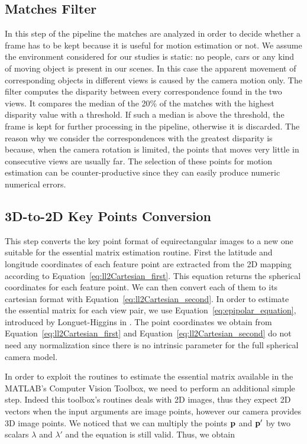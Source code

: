 \subsection{Matches Filter}
In this step of the pipeline the matches are analyzed in order to decide 
whether a frame has to be kept because it is useful for motion estimation or
not.
We assume the environment considered for our studies is static: no people, 
cars or any kind of moving object is present in our scenes. In this case the 
apparent movement of corresponding objects in different views is caused by 
the camera motion only.
The filter computes the disparity between every correspondence found in the 
two views. It compares the median of the 20\% of the matches with the highest 
disparity value with a threshold. If such a median is above 
the threshold, the frame is kept for further processing in the pipeline, 
otherwise it is discarded.
The reason why we consider the correspondences with the greatest disparity is 
because, when the camera rotation is limited, the points that moves very little 
in consecutive views are usually far. The selection of these points for motion 
estimation can be counter-productive since they can easily produce numeric 
numerical errors. 

\subsection{3D-to-2D Key Points Conversion}
\label{sec:keypoints_conversion}
This step converts the key point format of equirectangular images to a new one 
suitable for the essential matrix estimation routine.
First the latitude and longitude coordinates of each feature point are 
extracted from the 2D mapping according to  
Equation~\ref{eq:ll2Cartesian_first}.
This equation returns the spherical coordinates for each feature point. 
We can then convert each of them to its cartesian format with 
Equation~\ref{eq:ll2Cartesian_second}. In order to estimate the essential 
matrix for each view pair, we use Equation~\ref{eq:epipolar_equation}, 
introduced by Longuet-Higgins in \cite{longuet1981computer}.
The point coordinates we obtain from Equation~\ref{eq:ll2Cartesian_first} and
Equation~\ref{eq:ll2Cartesian_second} do not need any normalization since there
is no intrinsic parameter for the full spherical camera model.

In order to exploit the routines to estimate the essential matrix available 
in the MATLAB's Computer Vision Toolbox, we need to perform an additional simple 
step.
Indeed this toolbox's routines deals with 2D images, thus they expect 
2D vectors when the input arguments are image points, however our camera
provides 3D image points.
We noticed that we can multiply the points $\mathbf{p}$
and $\mathbf{p}'$ by two 
scalars ${\lambda}$ and 
${\lambda}'$ and the equation is still valid. Thus, we obtain

